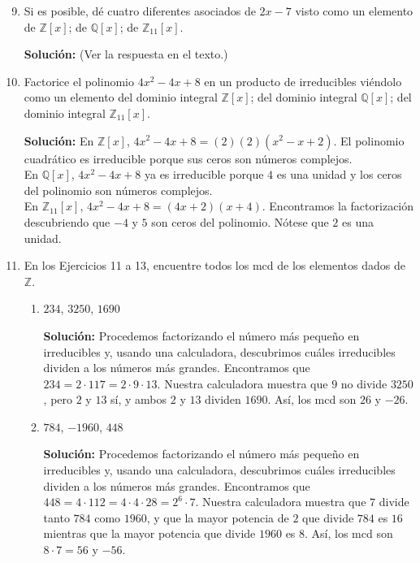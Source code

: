 \begin{enumerate}
    \setcounter{enumi}{8}
    \item Si es posible, dé cuatro diferentes asociados de $2x - 7$ visto como un elemento de $\mathbb{Z}[x]$; de $\mathbb{Q}[x]$; de $\mathbb{Z}_{11}[x]$.
    
    \textbf{Solución:} (Ver la respuesta en el texto.)

    \item Factorice el polinomio $4x^2 - 4x + 8$ en un producto de irreducibles viéndolo como un elemento del dominio integral $\mathbb{Z}[x]$; del dominio integral $\mathbb{Q}[x]$; del dominio integral $\mathbb{Z}_{11}[x]$.
    
    \textbf{Solución:} En $\mathbb{Z}[x]$, $4x^2 - 4x + 8 = (2)(2)(x^2 - x + 2)$. El polinomio cuadrático es irreducible porque sus ceros son números complejos.\\
    En $\mathbb{Q}[x]$, $4x^2 - 4x + 8$ ya es irreducible porque $4$ es una unidad y los ceros del polinomio son números complejos.\\
    En $\mathbb{Z}_{11}[x]$, $4x^2 - 4x + 8 = (4x + 2)(x + 4)$. Encontramos la factorización descubriendo que $-4$ y $5$ son ceros del polinomio. Nótese que $2$ es una unidad.

    \item En los Ejercicios 11 a 13, encuentre todos los mcd de los elementos dados de $\mathbb{Z}$.
    \begin{enumerate}
        \item $234$, $3250$, $1690$
        
        \textbf{Solución:} Procedemos factorizando el número más pequeño en irreducibles y, usando una calculadora, descubrimos cuáles irreducibles dividen a los números más grandes. Encontramos que $234 = 2 \cdot 117 = 2 \cdot 9 \cdot 13$. Nuestra calculadora muestra que $9$ no divide $3250$, pero $2$ y $13$ sí, y ambos $2$ y $13$ dividen $1690$. Así, los mcd son $26$ y $-26$.

        \item $784$, $-1960$, $448$
        
        \textbf{Solución:} Procedemos factorizando el número más pequeño en irreducibles y, usando una calculadora, descubrimos cuáles irreducibles dividen a los números más grandes. Encontramos que $448 = 4 \cdot 112 = 4 \cdot 4 \cdot 28 = 2^6 \cdot 7$. Nuestra calculadora muestra que $7$ divide tanto $784$ como $1960$, y que la mayor potencia de $2$ que divide $784$ es $16$ mientras que la mayor potencia que divide $1960$ es $8$. Así, los mcd son $8 \cdot 7 = 56$ y $-56$.


\end{enumerate}
\end{enumerate}
